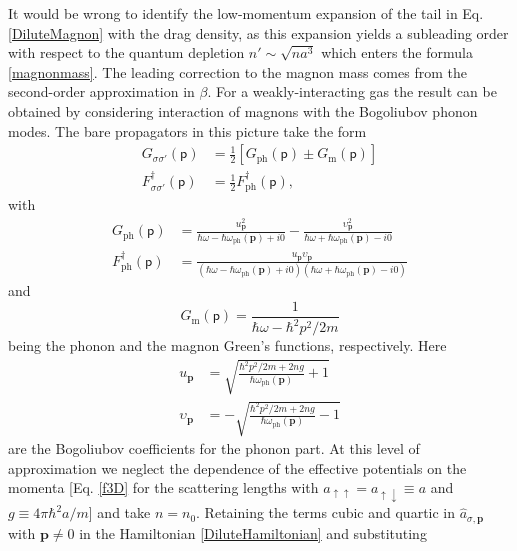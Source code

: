 \documentclass[reprint,superscriptaddress,showpacs,nofootinbib,aps,pra]{revtex4-1}
\begin{document}
It would be wrong to identify the low-momentum expansion of the tail in Eq. \eqref{DiluteMagnon} with the drag density, as this expansion yields a subleading order with respect to the quantum depletion $n'\sim \sqrt{na^3}$ which enters the formula \eqref{magnonmass}. The leading correction to the magnon mass comes from the second-order approximation in $\beta$. For a weakly-interacting gas the result can be obtained by considering interaction of magnons with the Bogoliubov phonon modes. The bare propagators in this picture take the form
\begin{equation*}
\begin{split}
G_{\sigma\sigma'}(\mathsf p)&=\frac{1}{2}[G_\mathrm{ph}(\mathsf p)\pm G_\mathrm{m}(\mathsf p)]\\
F_{\sigma\sigma'}^\dagger(\mathsf p)&=\frac{1}{2}F_\mathrm{ph}^\dagger(\mathsf p),
\end{split}
\end{equation*}
with
\begin{equation}
\label{PhononG}
\begin{split}
G_\mathrm{ph}(\mathsf p)&=\frac{u_{\bm p}^2}{\hbar\omega-\hbar\omega_\mathrm{ph}(\bm p)+i0}-\frac{\upsilon_{\bm p}^2}{\hbar\omega+\hbar\omega_\mathrm{ph}(\bm p)-i0}\\
F_\mathrm{ph}^\dagger(\mathsf p)&=\frac{u_{\bm p} \upsilon_{\bm p}}{(\hbar\omega-\hbar\omega_\mathrm{ph}(\bm p)+i0)(\hbar\omega+\hbar\omega_\mathrm{ph}(\bm p)-i0)}
\end{split}
\end{equation}
and
\begin{equation}
\label{MagnonG}
G_\mathrm{m}(\mathsf p)=\frac{1}{\hbar\omega-\hbar^2 p^2/2m}
\end{equation}
being the phonon and the magnon Green's functions, respectively. Here
\begin{equation}
\label{BogoliubovCoeff}
\begin{split}
u_{\bm p}&=\sqrt{\frac{\hbar^2 p^2/2m+2ng}{\hbar\omega_\mathrm{ph}(\bm p)}+1}\\
\upsilon_{\bm p}&=-\sqrt{\frac{\hbar^2 p^2/2m+2ng}{\hbar\omega_\mathrm{ph}(\bm p)}-1}
\end{split}
\end{equation}
are the Bogoliubov coefficients for the phonon part. At this level of approximation we neglect the dependence of the effective potentials on the momenta [Eq. \eqref{f3D} for the scattering lengths with $a_{\uparrow\uparrow}=a_{\uparrow\downarrow}\equiv a$ and $g\equiv 4\pi\hbar^2 a/m$]  and take $n=n_0$. Retaining the terms cubic and quartic in $\hat a_{\sigma,\bm p}$ with $\bm p\neq 0$ in the Hamiltonian \eqref{DiluteHamiltonian} and substituting 
\end{document}
